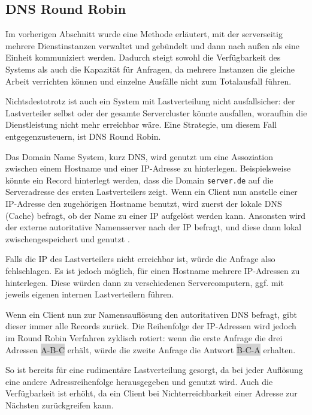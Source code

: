 \subsection{DNS Round Robin}
Im vorherigen Abschnitt wurde eine Methode erläutert, mit der serverseitig mehrere Dienstinstanzen verwaltet und gebündelt und dann nach außen als eine Einheit kommuniziert werden. Dadurch steigt sowohl die Verfügbarkeit des Systems als auch die Kapazität für Anfragen, da mehrere Instanzen die gleiche Arbeit verrichten können und einzelne Ausfälle nicht zum Totalausfall führen.

Nichtsdestotrotz ist auch ein System mit Lastverteilung nicht ausfallsicher: der Lastverteiler selbst oder der gesamte Servercluster könnte ausfallen, woraufhin die Dienstleistung nicht mehr erreichbar wäre. Eine Strategie, um diesem Fall entgegenzusteuern, ist DNS Round Robin.

Das Domain Name System, kurz DNS, wird genutzt um eine Assoziation zwischen einem Hostname und einer IP-Adresse zu hinterlegen. Beispielsweise könnte ein Record hinterlegt werden, dass die Domain \verb|server.de| auf die Serveradresse des ersten Lastverteilers zeigt. Wenn ein Client nun anstelle einer IP-Adresse den zugehörigen Hostname benutzt, wird zuerst der lokale DNS (Cache) befragt, ob der Name zu einer IP aufgelöst werden kann. Ansonsten wird der externe autoritative Namensserver nach der IP befragt, und diese dann lokal zwischengespeichert und genutzt \cite{Kopparapu.2002}.

Falls die IP des Lastverteilers nicht erreichbar ist, würde die Anfrage also fehlschlagen. Es ist jedoch möglich, für einen Hostname mehrere IP-Adressen zu hinterlegen. Diese würden dann zu verschiedenen Servercomputern, ggf. mit jeweils eigenen internen Lastverteilern führen. 

Wenn ein Client nun zur Namensauflösung den autoritativen DNS befragt, gibt dieser immer alle Records zurück. Die Reihenfolge der IP-Adressen wird jedoch im Round Robin Verfahren zyklisch rotiert: wenn die erste Anfrage die drei Adressen \colorbox{lightgray}{A-B-C} erhält, würde die zweite Anfrage die Antwort \colorbox{lightgray}{B-C-A} erhalten.

So ist bereits für eine rudimentäre Lastverteilung gesorgt, da bei jeder Auflösung eine andere Adressreihenfolge herausgegeben und genutzt wird. Auch die Verfügbarkeit ist erhöht, da ein Client bei Nichterreichbarkeit einer Adresse zur Nächsten zurückgreifen kann.


